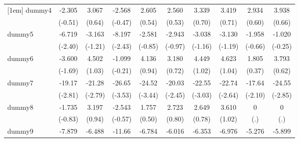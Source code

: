{\begin{tabular}{l*{9}{c}}
[1em]
dummy4      &      -2.305         &       3.067         &      -2.568         &       2.605         &       2.560         &       3.339         &       3.419         &       2.934         &       3.938         \\
            &     (-0.51)         &      (0.64)         &     (-0.47)         &      (0.54)         &      (0.53)         &      (0.70)         &      (0.71)         &      (0.60)         &      (0.66)         \\
[1em]
dummy5      &      -6.719\sym{*}  &      -3.163         &      -8.197\sym{*}  &      -2.581         &      -2.943         &      -3.038         &      -3.130         &      -1.958         &      -1.020         \\
            &     (-2.40)         &     (-1.21)         &     (-2.43)         &     (-0.85)         &     (-0.97)         &     (-1.16)         &     (-1.19)         &     (-0.66)         &     (-0.25)         \\
[1em]
dummy6      &      -3.600         &       4.502         &      -1.099         &       4.136         &       3.180         &       4.449         &       4.623         &       1.805         &       3.793         \\
            &     (-1.69)         &      (1.03)         &     (-0.21)         &      (0.94)         &      (0.72)         &      (1.02)         &      (1.04)         &      (0.37)         &      (0.62)         \\
[1em]
dummy7      &      -19.17\sym{**} &      -21.28\sym{**} &      -26.65\sym{***}&      -24.52\sym{***}&      -20.03\sym{*}  &      -22.55\sym{**} &      -22.74\sym{**} &      -17.64\sym{*}  &      -24.55\sym{**} \\
            &     (-2.81)         &     (-2.79)         &     (-3.53)         &     (-3.44)         &     (-2.45)         &     (-3.03)         &     (-2.64)         &     (-2.10)         &     (-2.85)         \\
[1em]
dummy8      &      -1.735         &       3.197         &      -2.543         &       1.757         &       2.723         &       2.649         &       3.610         &           0         &           0         \\
            &     (-0.83)         &      (0.94)         &     (-0.57)         &      (0.50)         &      (0.80)         &      (0.78)         &      (1.02)         &         (.)         &         (.)         \\
[1em]
dummy9      &      -7.879         &      -6.488         &      -11.66\sym{*}  &      -6.784         &      -6.016         &      -6.353         &      -6.976         &      -5.276         &      -5.899         \\

\end{tabular}}
